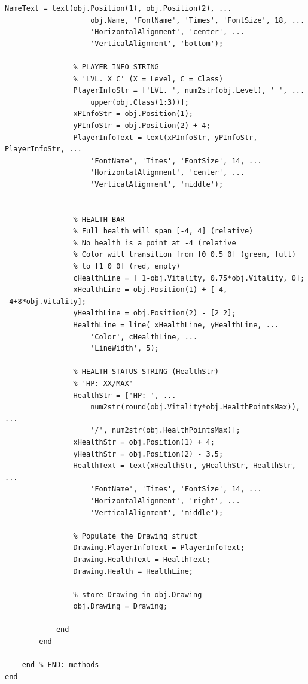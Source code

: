 \begin{lstlisting}[style=Matlab-editor, label=AvatarClassDef01, caption={A \texttt{draw()} method was added to the \texttt{Avatar} class.}]
                NameText = text(obj.Position(1), obj.Position(2), ...
                    obj.Name, 'FontName', 'Times', 'FontSize', 18, ...
                    'HorizontalAlignment', 'center', ...
                    'VerticalAlignment', 'bottom');
                
                % PLAYER INFO STRING
                % 'LVL. X C' (X = Level, C = Class)
                PlayerInfoStr = ['LVL. ', num2str(obj.Level), ' ', ...
                    upper(obj.Class(1:3))];
                xPInfoStr = obj.Position(1);
                yPInfoStr = obj.Position(2) + 4;
                PlayerInfoText = text(xPInfoStr, yPInfoStr, PlayerInfoStr, ...
                    'FontName', 'Times', 'FontSize', 14, ...
                    'HorizontalAlignment', 'center', ...
                    'VerticalAlignment', 'middle');
                
                
                % HEALTH BAR
                % Full health will span [-4, 4] (relative)
                % No health is a point at -4 (relative
                % Color will transition from [0 0.5 0] (green, full)
                % to [1 0 0] (red, empty)
                cHealthLine = [ 1-obj.Vitality, 0.75*obj.Vitality, 0];
                xHealthLine = obj.Position(1) + [-4, -4+8*obj.Vitality];
                yHealthLine = obj.Position(2) - [2 2];
                HealthLine = line( xHealthLine, yHealthLine, ...
                    'Color', cHealthLine, ...
                    'LineWidth', 5);

                % HEALTH STATUS STRING (HealthStr)
                % 'HP: XX/MAX'
                HealthStr = ['HP: ', ...
                    num2str(round(obj.Vitality*obj.HealthPointsMax)), ...
                    '/', num2str(obj.HealthPointsMax)];
                xHealthStr = obj.Position(1) + 4;
                yHealthStr = obj.Position(2) - 3.5;
                HealthText = text(xHealthStr, yHealthStr, HealthStr, ...
                    'FontName', 'Times', 'FontSize', 14, ...
                    'HorizontalAlignment', 'right', ...
                    'VerticalAlignment', 'middle');

                % Populate the Drawing struct
                Drawing.PlayerInfoText = PlayerInfoText;
                Drawing.HealthText = HealthText;
                Drawing.Health = HealthLine;
                
                % store Drawing in obj.Drawing
                obj.Drawing = Drawing;
                
            end
        end
        
    end % END: methods
end
\end{lstlisting}
